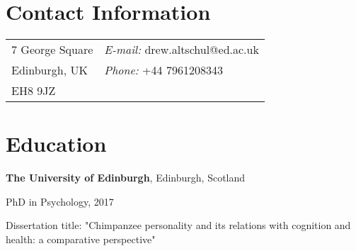 \documentclass[margin,line]{res}
\newenvironment{list1}{
  \begin{list}{\ding{113}}{%
      \setlength{\itemsep}{0in}
      \setlength{\parsep}{0in} \setlength{\parskip}{0in}
      \setlength{\topsep}{0in} \setlength{\partopsep}{0in} 
      \setlength{\leftmargin}{0.17in}}}{\end{list}}
\begin{document}

\begin{resume}
\section{\sc Contact Information}
\vspace{.05in}
\begin{tabular}{@{}p{3in}p{4in}}
7 George Square  & {\it E-mail:}  drew.altschul@ed.ac.uk\\            
Edinburgh, UK & {\it Phone:} +44 7961208343 \\    
EH8 9JZ \\
\end{tabular}



%

\section{\sc Education}

{\bf The University of Edinburgh}, Edinburgh, Scotland\\
\vspace*{-.1in}
\begin{list1}
\item[] PhD in Psychology, 2017
\item[] Dissertation title: "Chimpanzee personality and its relations with cognition and health: a comparative perspective"
\vspace*{.05in}
\end{list1}


\end{resume}
\end{document}
